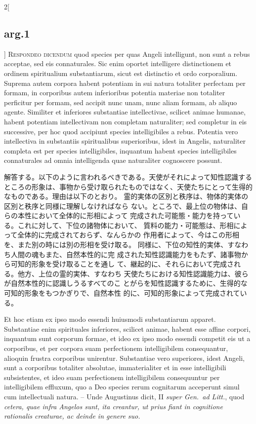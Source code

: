 \documentclass[paper=a4paper,fontsize=10pt,jafontsize=9pt,titlepage]{jlreq}
\begin{document}
\begin{paracol}{2}[\subsection{arg.1}]
{\scshape Respondeo dicendum} quod species per quas Angeli intelligunt,
non sunt a rebus acceptae, sed eis connaturales. Sic enim oportet
intelligere distinctionem et ordinem spiritualium substantiarum, sicut
est distinctio et ordo corporalium. Suprema autem corpora habent
potentiam in sui natura totaliter perfectam per formam, in corporibus
autem inferioribus potentia materiae non totaliter perficitur per
formam, sed accipit nunc unam, nunc aliam formam, ab aliquo
agente. Similiter et inferiores substantiae intellectivae, scilicet
animae humanae, habent potentiam intellectivam non completam
naturaliter; sed completur in eis successive, per hoc quod accipiunt
species intelligibiles a rebus. Potentia vero intellectiva in
substantiis spiritualibus superioribus, idest in Angelis, naturaliter
completa est per species intelligibiles, inquantum habent species
intelligibiles connaturales ad omnia intelligenda quae naturaliter
cognoscere possunt.

\switchcolumn

解答する。以下のように言われるべきである。天使がそれによって知性認識する
ところの形象は、事物から受け取られたものではなく、天使たちにとって生得的
 なものである。理由は以下のとおり。
霊的実体の区別と秩序は、物体的実体の区別と秩序と同様に理解しなければなら
 ない。ところで、最上位の物体は、自らの本性において全体的に形相によって
 完成された可能態・能力を持っている。これに対して、下位の諸物体において、
 質料の能力・可能態は、形相によって全体的に完成されておらず、なんらかの
 作用者によって、今はこの形相を、また別の時には別の形相を受け取る。
同様に、下位の知性的実体、すなわち人間の魂もまた、自然本性的に完
 成された知性認識能力をもたず、諸事物から可知的形象を受け取ることを通し
 て、継起的に、それらにおいて完成される。他方、上位の霊的実体、すなわち
 天使たちにおける知性認識能力は、彼らが自然本性的に認識しうるすべてのこ
 とがらを知性認識するために、生得的な可知的形象をもつかぎりで、自然本性
 的に、可知的形象によって完成されている。

\switchcolumn*

Et hoc etiam ex ipso modo essendi huiusmodi
substantiarum apparet. Substantiae enim spirituales inferiores, scilicet
animae, habent esse affine corpori, inquantum sunt corporum formae, et
ideo ex ipso modo essendi competit eis ut a corporibus, et per corpora
suam perfectionem intelligibilem consequantur, alioquin frustra
corporibus unirentur. Substantiae vero superiores, idest Angeli, sunt a
corporibus totaliter absolutae, immaterialiter et in esse intelligibili
subsistentes, et ideo suam perfectionem intelligibilem consequuntur per
intelligibilem effluxum, quo a Deo species rerum cognitarum acceperunt
simul cum intellectuali natura. -- Unde Augustinus dicit, II {\itshape
 super Gen.~ad Litt.}, quod {\itshape cetera, quae infra Angelos sunt, ita creantur, ut prius
fiant in cognitione rationalis creaturae, ac deinde in genere suo.}


\end{paracol}
\end{document}
